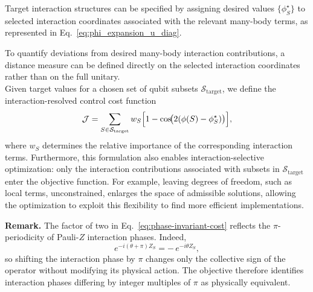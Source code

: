 \noindent
Target interaction structures can be specified by assigning desired values $\{\phi_S^\star\}$ to selected interaction coordinates associated with the relevant many-body terms, as represented in Eq.~\eqref{eq:phi_expansion_u_diag}.


\noindent
To quantify deviations from desired many-body interaction contributions, a distance measure can be defined directly on the selected interaction coordinates rather than on the full unitary.\\
Given target values for a chosen set of qubit subsets  $\mathcal{S}_{\mathrm{target}}$, we define the interaction-resolved control cost function
\begin{equation}
\label{eq:phase-invariant-cost}
\mathcal{J}
=
\sum_{S\in\mathcal{S}_{\mathrm{target}}}
w_S
\Bigl[
1-\cos\!\bigl(2(\phi(S)-\phi_S^\star)\bigr)
\Bigr],
\end{equation}
where $w_S$ determines the relative importance of the corresponding interaction terms. 
Furthermore, this formulation also enables interaction-selective optimization: only the interaction contributions associated with subsets in $\mathcal{S}_{\mathrm{target}}$ enter the objective function. For example, leaving degrees of freedom, such as local terms, unconstrained, enlarges the space of admissible solutions, allowing the optimization to exploit this flexibility to find more efficient implementations.

\medskip
\noindent
\textbf{Remark.}
The factor of two in Eq.~\eqref{eq:phase-invariant-cost} reflects the $\pi$-periodicity of Pauli-$Z$ interaction phases. Indeed,
\begin{equation}
e^{-i(\theta+\pi)Z_S}
=
-\,e^{-i\theta Z_S},
\label{eq:pi_peridicity}
\end{equation}
so shifting the interaction phase by $\pi$ changes only the collective sign of the operator without modifying its physical action. The objective therefore identifies interaction phases differing by integer multiples of $\pi$ as physically equivalent.


